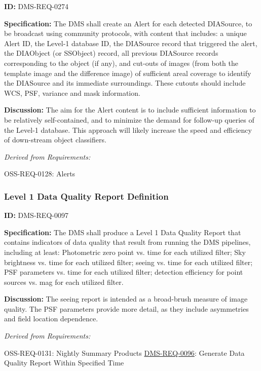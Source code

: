 \documentclass[SE,toc,lsstdraft]{lsstdoc}
\begin{document}
\label{DMS-REQ-0274}
\textbf{ID:} DMS-REQ-0274

\textbf{Specification:} The DMS shall create an Alert for each detected DIASource, to be broadcast using community protocols, with content that includes: a unique Alert ID, the Level-1 database ID, the DIASource record that triggered the alert, the DIAObject (or SSObject) record, all previous DIASource records corresponding to the object (if any), and cut-outs of images (from both the template image and the difference image) of sufficient areal coverage to identify the DIASource and its immediate surroundings. These cutouts should include WCS, PSF, variance and mask information.

\textbf{Discussion: }The aim for the Alert content is to include sufficient information to be relatively self-contained, and to minimize the demand for follow-up queries of the Level-1 database. This approach will likely increase the speed and efficiency of down-stream object classifiers.




\emph{Derived from Requirements:}

OSS-REQ-0128:
Alerts \newline


\subsubsection{Level 1 Data Quality Report Definition}

\label{DMS-REQ-0097}
\textbf{ID:} DMS-REQ-0097

\textbf{Specification:} The DMS shall produce a Level 1 Data Quality Report that contains indicators of data quality that result from running the DMS pipelines, including at least: Photometric zero point vs. time for each utilized filter; Sky brightness vs. time for each utilized filter; seeing vs. time for each utilized filter; PSF parameters vs. time for each utilized filter; detection efficiency for point sources vs. mag for each utilized filter.

\textbf{Discussion:} The seeing report is intended as a broad-brush measure of image quality.  The PSF parameters provide more detail, as they include asymmetries and field location dependence.




\emph{Derived from Requirements:}

OSS-REQ-0131:
Nightly Summary Products \newline
\hyperref[DMS-REQ-0096]{DMS-REQ-0096}:
Generate Data Quality Report Within Specified Time \newline
\end{document}
